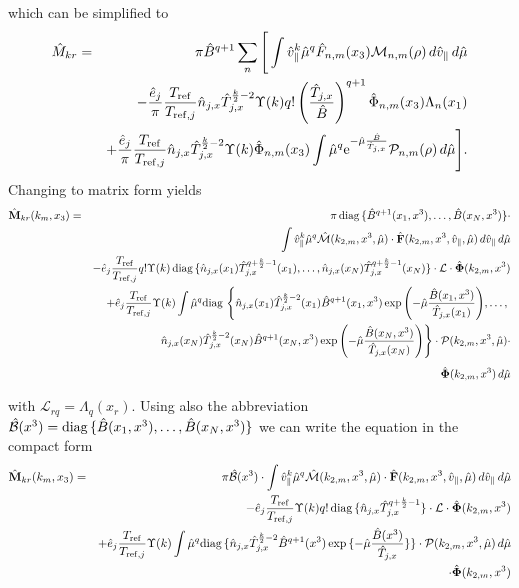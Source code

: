 which can be simplified to
\begin{eqnarray}
\hat{M}_{kr} & = & \pi\hat{B}^{q+1}  \sum_n \Bigg[
   \int \hat{v}_\|^k \hat{\mu}^q
     \hat{F}_{n,m}(x_3)\mathcal{M}_{n,m}(\rho)\,d\hat{v}_\|\,d\hat{\mu} \nonumber \\
      &&-\frac{\hat{e}_j}{\pi}\frac{T_{\mathrm{ref}}}{T_{\mathrm{ref},j}} \hat{n}_{j,x}\hat{T}_{j,x}^{\frac{k}{2}-2} \Upsilon(k) q! 
      \left(\frac{\hat{T}_{j,x}}{\hat{B}}\right)^{q+1}
      \hat{\Phi}_{n,m}(x_3) \Lambda_n(x_1)\\
      &&+\frac{\hat{e}_j}{\pi}\frac{T_{\mathrm{ref}}}{T_{\mathrm{ref},j}} \hat{n}_{j,x}\hat{T}_{j,x}^{\frac{k}{2}-2} 
      \Upsilon(k) \hat{\Phi}_{n,m}(x_3) 
      \int \hat{\mu}^q {\rm e}^{-\hat{\mu}\frac{\hat{B}}{\hat{T}_{j,x}}} 
     \mathcal{P}_{n,m}(\rho)\,d\hat{\mu}\Bigg]. \nonumber
\end{eqnarray}
Changing to matrix form yields
\begin{eqnarray*}
\hat{\mathbf{M}}_{kr}(k_m,x_3) &=& \pi\,\mbox{diag}\,\{\hat{B}^{q+1}(x_1,x^3),\ldots,
   \hat{B}(x_N,x^3)\}\cdot\\
&& \int \hat{v}_\|^k \hat{\mu}^q
   \hat{\mathcal{M}}(k_{2,m},x^3,\hat{\mu})\cdot
   \hat{\mathbf{F}}(k_{2,m},x^3,\hat{v}_\|,\hat{\mu})\,d\hat{v}_\|\,d\hat{\mu} \\
&& -\hat{e}_j\frac{T_{\mathrm{ref}}}{T_{\mathrm{ref},j}} q!\Upsilon(k)\, 
   \mbox{diag}\,\{\hat{n}_{j,x}(x_1)\hat{T}_{j,x}^{q+\frac{k}{2}-1}(x_1),\ldots,\hat{n}_{j,x}(x_N)\hat{T}_{j,x}^{q+\frac{k}{2}-1}(x_N)\}\cdot
   \mathcal{L} \cdot\hat{\mathbf{\Phi}}(k_{2,m},x^3)\\
&& +\hat{e}_j\frac{T_{\mathrm{ref}}}{T_{\mathrm{ref},j}}\Upsilon(k) \int \hat{\mu}^q 
   \mbox{diag}\,\left\{\hat{n}_{j,x}(x_1)\hat{T}_{j,x}^{\frac{k}{2}-2}(x_1)\hat{B}^{q+1}(x_1,x^3)
   \exp{\left(-\hat{\mu}\frac{\hat{B}(x_1,x^3)}{\hat{T}_{j,x}(x_1)}\right)},\ldots,\right.\\
&& \phantom{e_j\int}\left.\hat{n}_{j,x}(x_N)\hat{T}_{j,x}^{\frac{k}{2}-2}(x_N)
   \hat{B}^{q+1}(x_N,x^3)
      \exp{\left(-\hat{\mu}\frac{\hat{B}(x_N,x^3)}{\hat{T}_{j,x}(x_N)}\right)}\right\}\cdot
   \mathcal{P}(k_{2,m},x^3,\hat{\mu})\cdot\\
&& \phantom{e_j\int} \hat{\mathbf{\Phi}}(k_{2,m},x^3)\,d\hat{\mu}
\end{eqnarray*}
with $\mathcal{L}_{rq}=\Lambda_q(x_r)$. Using also the abbreviation
$\hat{\mathcal{B}}(x^3)=\mbox{diag}\,\{\hat{B}(x_1,x^3),\ldots,\hat{B}(x_N,x^3)\}$
we can write the equation in the compact form
\begin{eqnarray*}
\hat{\mathbf{M}}_{kr}(k_m,x_3)  &=&  \pi\hat{\mathcal{B}}(x^3)
   \cdot \int \hat{v}_\|^k \hat{\mu}^q
   \hat{\mathcal{M}}(k_{2,m},x^3,\hat{\mu})\cdot
   \hat{\mathbf{F}}(k_{2,m},x^3,\hat{v}_\|,\hat{\mu})\,d\hat{v}_\|\,d\hat{\mu} \\
&& -\hat{e}_j\frac{T_{\mathrm{ref}}}{T_{\mathrm{ref},j}} \Upsilon(k) q!\, \mbox{diag}\,\{\hat{n}_{j,x}\hat{T}_{j,x}^{q+\frac{k}{2}-1}\}\cdot
   \mathcal{L} \cdot\hat{\mathbf{\Phi}}(k_{2,m},x^3)\\
&& +\hat{e}_j\frac{T_{\mathrm{ref}}}{T_{\mathrm{ref},j}} \Upsilon(k) \int \hat{\mu}^q 
   \mbox{diag}\,\{\hat{n}_{j,x}\hat{T}_{j,x}^{\frac{k}{2}-2}\hat{B}^{q+1}(x^3)\exp{\{-\hat{\mu}
       \frac{\hat{B}(x^3)}{\hat{T}_{j,x}}\}}\}\cdot
   \mathcal{P}(k_{2,m},x^3,\hat{\mu})\,d\hat{\mu}\\
&& \cdot\hat{\mathbf{\Phi}}(k_{2,m},x^3)
\end{eqnarray*}

